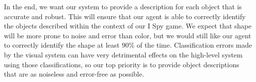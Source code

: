 \documentclass[11pt]{article}
\begin{document}
In the end, we want our system to provide a description for each object that is accurate and robust. This will ensure that our agent is able to correctly identify the objects described within the context of our I Spy game. We expect that shape will be more prone to noise and error than color, but we would still like our agent to correctly identify the shape at least 90\% of the time. Classification errors made by the visual system can have very detrimental effects on the high-level system using those classifications, so our top priority is to provide object descriptions that are as noiseless and error-free as possible.



\end{document}
